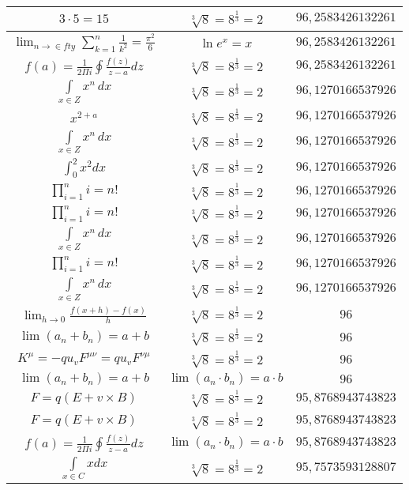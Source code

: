 \documentclass{article}
\begin{document}
\begin{flushleft}
\begin{longtable}{|c|c|c|}
$3\cdot 5=15$ & $\sqrt[3]{8}=8^{\frac{1}{3}}=2$ & $96,2583426132261$ \\ \hline 
$\lim_{n\to\in fty}\sum_{k=1}^n\frac{1}{k^2}=\frac{\pi^2}{6}$ & $\ln e^x=x$ & $96,2583426132261$ \\ \hline 
$f\left(a\right)=\frac{1}{2\Pi i}\oint\frac{f\left(z\right)}{z-a}dz$ & $\sqrt[3]{8}=8^{\frac{1}{3}}=2$ & $96,2583426132261$ \\ \hline 
$\int \limits_{x\in Z}\!x^{n}\,dx$ & $\sqrt[3]{8}=8^{\frac{1}{3}}=2$ & $96,1270166537926$ \\ \hline 
$x^{2+a}$ & $\sqrt[3]{8}=8^{\frac{1}{3}}=2$ & $96,1270166537926$ \\ \hline 
$\int \limits_{x\in Z}\!x^{n}\,dx$ & $\sqrt[3]{8}=8^{\frac{1}{3}}=2$ & $96,1270166537926$ \\ \hline 
$\int _0^2x^2dx$ & $\sqrt[3]{8}=8^{\frac{1}{3}}=2$ & $96,1270166537926$ \\ \hline 
$\prod_{i=1}^ni=n!$ & $\sqrt[3]{8}=8^{\frac{1}{3}}=2$ & $96,1270166537926$ \\ \hline 
$\prod_{i=1}^ni=n!$ & $\sqrt[3]{8}=8^{\frac{1}{3}}=2$ & $96,1270166537926$ \\ \hline 
$\int \limits_{x\in Z}\!x^{n}\,dx$ & $\sqrt[3]{8}=8^{\frac{1}{3}}=2$ & $96,1270166537926$ \\ \hline 
$\prod_{i=1}^ni=n!$ & $\sqrt[3]{8}=8^{\frac{1}{3}}=2$ & $96,1270166537926$ \\ \hline 
$\int \limits_{x\in Z}\!x^{n}\,dx$ & $\sqrt[3]{8}=8^{\frac{1}{3}}=2$ & $96,1270166537926$ \\ \hline 
$\lim_{h\to0}\frac{f(x+h)-f(x)}{h}$ & $\sqrt[3]{8}=8^{\frac{1}{3}}=2$ & $96$ \\ \hline 
$\lim\left(a_n+b_n\right)=a+b$ & $\sqrt[3]{8}=8^{\frac{1}{3}}=2$ & $96$ \\ \hline 
$K^\mu=-qu_vF^{\mu\nu}=qu_vF^{\nu\mu}$ & $\sqrt[3]{8}=8^{\frac{1}{3}}=2$ & $96$ \\ \hline 
$\lim\left(a_n+b_n\right)=a+b$ & $\lim\left(a_n\cdot b_n\right)=a\cdot b$ & $96$ \\ \hline 
$F=q\left(E+v\times B\right)$ & $\sqrt[3]{8}=8^{\frac{1}{3}}=2$ & $95,8768943743823$ \\ \hline 
$F=q\left(E+v\times B\right)$ & $\sqrt[3]{8}=8^{\frac{1}{3}}=2$ & $95,8768943743823$ \\ \hline 
$f\left(a\right)=\frac{1}{2\Pi i}\oint\frac{f\left(z\right)}{z-a}dz$ & $\lim\left(a_n\cdot b_n\right)=a\cdot b$ & $95,8768943743823$ \\ \hline 
$\int \limits_{x\in C}xdx$ & $\sqrt[3]{8}=8^{\frac{1}{3}}=2$ & $95,7573593128807$ \\ \hline 

\end{longtable}
\end{flushleft}
\end{document}
